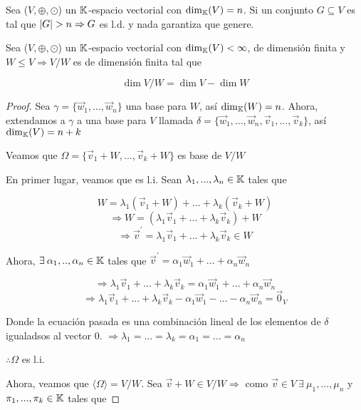 \begin{remark}
    Sea ($V, \oplus, \odot$) un $\mathbb{K}$-espacio vectorial con ${\dim}_{\mathbb{K}}(V) = n$. Si un conjunto $G \subseteq V$ es tal que $\abs{G} > n \Rightarrow G$ es l.d. y nada garantiza que genere.
\end{remark}

\begin{theorem}
    Sea ($V, \oplus, \odot$) un $\mathbb{K}$-espacio vectorial con ${\dim}_{\mathbb{K}}(V) < \infty$, de dimensión finita y $ W \leq V \Rightarrow V / W$ es de dimensión finita tal que

    $$\dim V / W = \dim V - \dim W$$
\end{theorem}

\begin{proof}
    Sea $\gamma = \{ \vec{w}_{1} , ... , \vec{w}_{n} \}$ una base para $W$, así ${\dim}_{\mathbb{K}}(W) = n$. Ahora, extendamos a $\gamma$ a una base para $V$ llamada $\delta = \{ \vec{w}_{1} , ... , \vec{w}_{n},\vec{v}_{1} , ... , \vec{v}_{k} \} $, así ${\dim}_{\mathbb{K}}(V) = n+k$

    Veamos que $ \Omega = \{\vec{v}_{1} + W , ... , \vec{v}_{k} + W\}$ es base de $V / W$

    En primer lugar, veamos que es l.i. Sean $\lambda_1, ..., \lambda_n \in \mathbb{K}$ tales que
    
    $$W = \lambda_1(\vec{v}_{1} + W) + ...+ \lambda_k(\vec{v}_{k} + W)$$
    $$\Rightarrow W = (\lambda_1\vec{v}_{1} + ... + \lambda_k\vec{v}_{k}) + W $$
    $$\Rightarrow \vec{v}^{\prime} = \lambda_1\vec{v}_{1} + ... + \lambda_k\vec{v}_{k} \in W$$

    Ahora, $\exists \: \alpha_1,..,\alpha_n \in \mathbb{K}$ tales que $ \vec{v}^{\prime} = \alpha_1\vec{w}_{1} + ... + \alpha_n\vec{w}_{n}$

    $$\Rightarrow \lambda_1\vec{v}_{1} + ... + \lambda_k\vec{v}_{k} = \alpha_1\vec{w}_{1} + ... + \alpha_n\vec{w}_{n}$$
    $$ \Rightarrow  \lambda_1\vec{v}_{1} + ... + \lambda_k\vec{v}_{k} - \alpha_1\vec{w}_{1} - ... - \alpha_n\vec{w}_{n} = \vec{0}_{V}$$

    Donde la ecuación pasada es una combinación lineal de los elementos de $\delta$ igualadsos al vector 0. $\Rightarrow \lambda_1 = ... = \lambda_k = \alpha_1 = ... = \alpha_n$

    $\therefore \Omega$ es l.i.

    Ahora, veamos que $\langle \Omega \rangle = V / W$. Sea $\vec{v} + W \in V / W \Rightarrow $ como $\vec{v} \in V \: \exists \: \mu_1,...,\mu_n$ y $\pi_1,...,\pi_k \in \mathbb{K}$ tales que


\end{proof}
